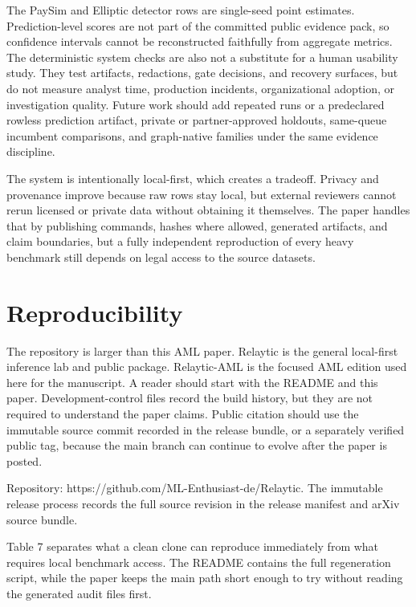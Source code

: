 \documentclass[11pt]{article}
\begin{document}
The PaySim and Elliptic detector rows are single-seed point estimates. Prediction-level scores are not part of the committed public evidence pack, so confidence intervals cannot be reconstructed faithfully from aggregate metrics. The deterministic system checks are also not a substitute for a human usability study. They test artifacts, redactions, gate decisions, and recovery surfaces, but do not measure analyst time, production incidents, organizational adoption, or investigation quality. Future work should add repeated runs or a predeclared rowless prediction artifact, private or partner-approved holdouts, same-queue incumbent comparisons, and graph-native families under the same evidence discipline.

The system is intentionally local-first, which creates a tradeoff. Privacy and provenance improve because raw rows stay local, but external reviewers cannot rerun licensed or private data without obtaining it themselves. The paper handles that by publishing commands, hashes where allowed, generated artifacts, and claim boundaries, but a fully independent reproduction of every heavy benchmark still depends on legal access to the source datasets.

\section{Reproducibility}

The repository is larger than this AML paper. Relaytic is the general local-first inference lab and public package. Relaytic-AML is the focused AML edition used here for the manuscript. A reader should start with the README and this paper. Development-control files record the build history, but they are not required to understand the paper claims. Public citation should use the immutable source commit recorded in the release bundle, or a separately verified public tag, because the main branch can continue to evolve after the paper is posted.

Repository: https://github.com/ML-Enthusiast-de/Relaytic. The immutable release process records the full source revision in the release manifest and arXiv source bundle.

Table 7 separates what a clean clone can reproduce immediately from what requires local benchmark access. The README contains the full regeneration script, while the paper keeps the main path short enough to try without reading the generated audit files first.
\end{document}
